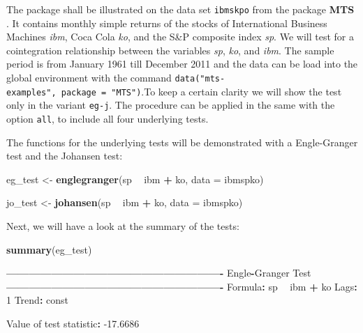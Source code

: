 \documentclass[12pt,a4paper]{article}
\newenvironment{Shaded}{\begin{snugshade}}{\end{snugshade}}
\newcommand{\DataTypeTok}[1]{\textcolor[rgb]{0.13,0.29,0.53}{#1}}
\newcommand{\DecValTok}[1]{\textcolor[rgb]{0.00,0.00,0.81}{#1}}
\newcommand{\FloatTok}[1]{\textcolor[rgb]{0.00,0.00,0.81}{#1}}
\newcommand{\KeywordTok}[1]{\textcolor[rgb]{0.13,0.29,0.53}{\textbf{#1}}}
\newcommand{\NormalTok}[1]{#1}
\newcommand{\OperatorTok}[1]{\textcolor[rgb]{0.81,0.36,0.00}{\textbf{#1}}}
\newcommand{\StringTok}[1]{\textcolor[rgb]{0.31,0.60,0.02}{#1}}
\begin{document}
The package shall be illustrated on the data set \texttt{ibmskpo} from
the package \textbf{MTS} \autocite{tsay_mts_2020}. It contains monthly
simple returns of the stocks of International Business Machines
\emph{ibm}, Coca Cola \emph{ko}, and the S\&P composite index \emph{sp}.
We will test for a cointegration relationship between the variables
\emph{sp}, \emph{ko}, and \emph{ibm}. The sample period is from January
1961 till December 2011 and the data can be load into the global
environment with the command
\texttt{data("mts-examples",\ package\ =\ "MTS")}.To keep a certain
clarity we will show the test only in the variant \texttt{eg-j}. The
procedure can be applied in the same with the option \texttt{all}, to
include all four underlying tests.

The functions for the underlying tests will be demonstrated with a
Engle-Granger test and the Johansen test:

\begin{Shaded}
\begin{Highlighting}[]
\NormalTok{eg_test <-}\StringTok{ }\KeywordTok{englegranger}\NormalTok{(sp }\OperatorTok{~}\StringTok{ }\NormalTok{ibm }\OperatorTok{+}\StringTok{ }\NormalTok{ko, }\DataTypeTok{data =}\NormalTok{ ibmspko)}

\NormalTok{jo_test <-}\StringTok{ }\KeywordTok{johansen}\NormalTok{(sp }\OperatorTok{~}\StringTok{ }\NormalTok{ibm }\OperatorTok{+}\StringTok{ }\NormalTok{ko, }\DataTypeTok{data =}\NormalTok{ ibmspko)}
\end{Highlighting}
\end{Shaded}

Next, we will have a look at the summary of the tests:

\begin{Shaded}
\begin{Highlighting}[]
\KeywordTok{summary}\NormalTok{(eg_test)}

\OperatorTok{----------------------------------------------------------}
\NormalTok{Engle}\OperatorTok{-}\NormalTok{Granger Test}
\OperatorTok{----------------------------------------------------------}
\NormalTok{Formula}\OperatorTok{:}\StringTok{ }\NormalTok{sp }\OperatorTok{~}\StringTok{ }\NormalTok{ibm }\OperatorTok{+}\StringTok{ }\NormalTok{ko}
\NormalTok{Lags}\OperatorTok{:}\StringTok{ }\DecValTok{1}
\NormalTok{Trend}\OperatorTok{:}\StringTok{ }\NormalTok{const}
 
\NormalTok{Value of test statistic}\OperatorTok{:}\StringTok{ }\FloatTok{-17.6686}
\end{Highlighting}
\end{Shaded}
\end{document}
